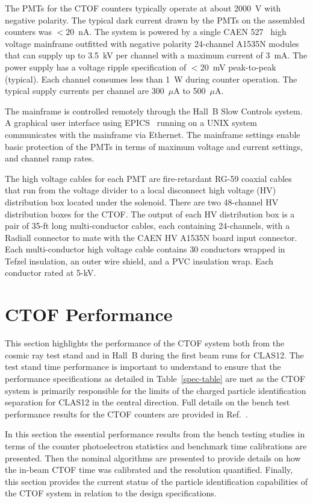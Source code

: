 \documentclass{elsart}
\begin{document}
The PMTs for the CTOF counters typically operate at about 2000~V with negative polarity. The typical
dark current drawn by the PMTs on the assembled counters was $<20$~nA. The system is powered by a
single CAEN 527~\cite{caen-527} high voltage mainframe outfitted with negative polarity 24-channel
A1535N modules that can supply up to 3.5~kV per channel with a maximum current of 3~mA. The power
supply has a voltage ripple specification of $<$20~mV peak-to-peak (typical). Each channel consumes less
than 1~W during counter operation. The typical supply currents per channel are 300~$\mu$A to
500~$\mu$A.

The mainframe is controlled remotely through the Hall~B Slow Controls system. A graphical user interface
using EPICS~\cite{epics} running on a UNIX system communicates with the mainframe via Ethernet. The
mainframe settings enable basic protection of the PMTs in terms of maximum voltage and current settings,
and channel ramp rates.

The high voltage cables for each PMT are fire-retardant RG-59 coaxial cables that run from the voltage
divider to a local disconnect high voltage (HV) distribution box located under the solenoid. There are two
48-channel HV distribution boxes for the CTOF. The output of each HV distribution box is a pair of 
35-ft long multi-conductor cables, each containing 24-channels, with a Radiall connector to mate with the
CAEN HV A1535N board input connector. Each multi-conductor high voltage cable contains 30 conductors
wrapped in Tefzel insulation, an outer wire shield, and a PVC insulation wrap. Each conductor rated at 5-kV.

\section{CTOF Performance}
\label{sec:performance}

This section highlights the performance of the CTOF system both from the cosmic ray test stand
and in Hall~B during the first beam runs for CLAS12. The test stand time performance is important
to understand to ensure that the performance specifications as detailed in Table~\ref{spec-table} are
met as the CTOF system is primarily responsible for the limits of the charged particle identification
separation for CLAS12 in the central direction. Full details on the bench test performance results for
the CTOF counters are provided in Ref.~\cite{dsc-cn2016-009}.

In this section the essential performance results from the bench testing studies in terms of the counter
photoelectron statistics and benchmark time calibrations are presented. Then the nominal algorithms
are presented to provide details on how the in-beam CTOF time was calibrated and the resolution
quantified. Finally, this section provides the current status of the particle identification capabilities
of the CTOF system in relation to the design specifications.
\end{document}
